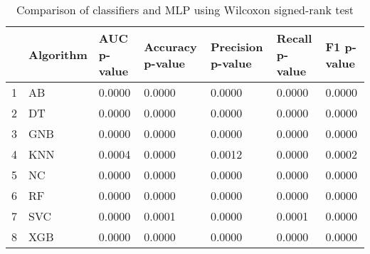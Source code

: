 \begin{table}
\footnotesize
\caption{Comparison of classifiers and MLP using Wilcoxon signed-rank test}
\label{tab:wilcoxon comparison}
\begin{tabular}{lllllll}
\hline
 & Algorithm & AUC p-value & Accuracy p-value & Precision p-value & Recall p-value & F1 p-value \\
\hline
1 & AB & 0.0000 & 0.0000 & 0.0000 & 0.0000 & 0.0000 \\
2 & DT & 0.0000 & 0.0000 & 0.0000 & 0.0000 & 0.0000 \\
3 & GNB & 0.0000 & 0.0000 & 0.0000 & 0.0000 & 0.0000 \\
4 & KNN & 0.0004 & 0.0000 & 0.0012 & 0.0000 & 0.0002 \\
5 & NC & 0.0000 & 0.0000 & 0.0000 & 0.0000 & 0.0000 \\
6 & RF & 0.0000 & 0.0000 & 0.0000 & 0.0000 & 0.0000 \\
7 & SVC & 0.0000 & 0.0001 & 0.0000 & 0.0001 & 0.0000 \\
8 & XGB & 0.0000 & 0.0000 & 0.0000 & 0.0000 & 0.0000 \\
\hline
\end{tabular}
\end{table}
